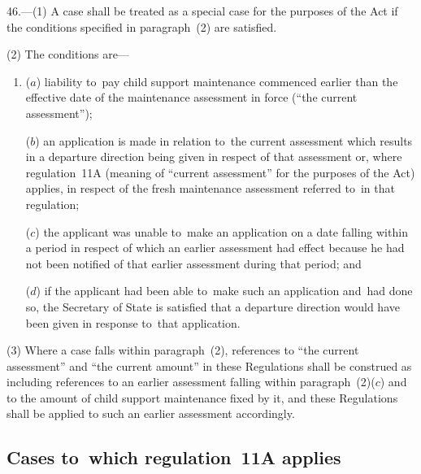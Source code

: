 \documentclass[12pt,a4paper]{article}
\begin{document}
46.—(1) A case shall be treated as a special case for
the purposes of the Act if the conditions specified in paragraph~(2) are
satisfied.

(2) The conditions are—
\begin{enumerate}\item[]
($a$) liability to~pay child support maintenance commenced earlier than the
effective date of the maintenance assessment in force (“the current
assessment”);

($b$) an application is made 
in relation to~the current assessment which results in a departure direction being given in respect of that assessment
or, where regulation~11A (meaning of “current assessment” for the purposes of the Act) applies, in respect of the fresh maintenance assessment referred to~in that regulation;  %

($c$) the applicant was unable to~make an application on a date falling within a
period in respect of which an earlier assessment had effect because he had not
been notified of that earlier assessment during that period; and

($d$) if the applicant had been able to~make such an application and~had done so,
the Secretary of State is satisfied that a departure direction would have been
given in response to~that application.
\end{enumerate}

(3) Where a case falls within paragraph~(2), references to “the current
assessment” and “the current amount” in these Regulations shall be construed as
including references to an earlier assessment falling within paragraph~(2)($c$)
and to the amount of child support maintenance fixed by it, and these
Regulations shall be applied to such an earlier assessment accordingly.


\subsection[46A. Cases to~which regulation~11A applies]{Cases to~which regulation~11A applies}
\end{document}
